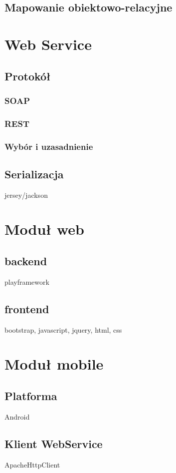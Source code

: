 \documentclass[11pt]{aghdpl}
\begin{document}
\subsection{Mapowanie obiektowo-relacyjne}
\section{Web Service}
\subsection{Protokół}
\subsubsection{SOAP}
\subsubsection{REST}
\subsubsection{Wybór i uzasadnienie}
\subsection{Serializacja}
jersey/jackson
\section{Moduł web}
\subsection{backend}
playframework
\subsection{frontend}
bootstrap, javascript, jquery, html, css
\section{Moduł mobile}
\subsection{Platforma}
Android
\subsection{Klient WebService}
ApacheHttpClient

\end{document}
